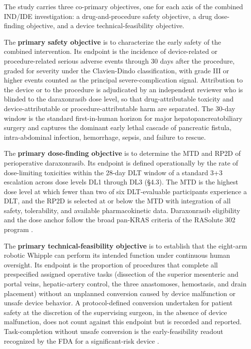 The study carries three co-primary objectives, one for each axis of the combined
IND/IDE investigation: a drug-and-procedure safety objective, a drug dose-finding
objective, and a device technical-feasibility objective.

The \textbf{primary safety objective} is to characterize the early safety of the
combined intervention. Its endpoint is the incidence of device-related or
procedure-related serious adverse events through 30 days after the procedure,
graded for severity under the Clavien-Dindo classification, with grade III or
higher events counted as the principal severe-complication signal. Attribution to
the device or to the procedure is adjudicated by an independent reviewer who is
blinded to the daraxonrasib dose level, so that drug-attributable toxicity and
device-attributable or procedure-attributable harm are separated. The 30-day
window is the standard first-in-human horizon for major hepatopancreatobiliary
surgery and captures the dominant early lethal cascade of pancreatic fistula,
intra-abdominal infection, hemorrhage, sepsis, and failure to rescue.

The \textbf{primary dose-finding objective} is to determine the MTD and RP2D of
perioperative daraxonrasib. Its endpoint is defined operationally by the rate of
dose-limiting toxicities within the 28-day DLT window of a standard 3+3
escalation across dose levels DL1 through DL3 (\S4.3). The MTD is the highest
dose level at which fewer than two of six DLT-evaluable participants experience a
DLT, and the RP2D is selected at or below the MTD with integration of all safety,
tolerability, and available pharmacokinetic data. Daraxonrasib eligibility and
the dose anchor follow the broad pan-KRAS criteria of the RASolute 302 program
\cite{rasolute302}.

The \textbf{primary technical-feasibility objective} is to establish that the
eight-arm robotic Whipple can perform its intended function under continuous human
oversight. Its endpoint is the proportion of procedures that complete all
prespecified assigned operative tasks (dissection of the superior mesenteric and
portal veins, hepatic-artery control, the three anastomoses, hemostasis, and
drain placement) without an unplanned conversion caused by device malfunction or
unsafe device behavior. A protocol-defined conversion undertaken for patient
safety at the discretion of the supervising surgeon, in the absence of device
malfunction, does not count against this endpoint but is recorded and reported.
Task-completion without unsafe conversion is the early-feasibility readout
recognized by the FDA for a significant-risk device \cite{fda2013earlyfeasibility}.

